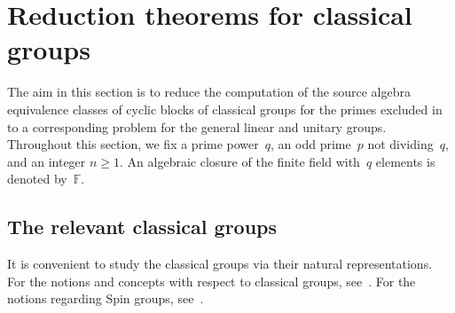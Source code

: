 \documentclass[12pt]{amsart}
\theoremstyle{theorem}
\theoremstyle{definition}
\theoremstyle{remark}
\begin{document}
\section{Reduction theorems for classical groups}

The aim in this section is to reduce the computation of the source algebra 
equivalence classes of cyclic blocks of classical groups for the primes excluded 
in \cite[Proposition~$6.5$(a)]{HL24} to a corresponding problem for the general 
linear and unitary groups. Throughout this section, we fix a prime power~$q$, an 
odd prime~$p$ not dividing~$q$, and an integer $n \geq 1$. An algebraic closure
of the finite field with~$q$ elements is denoted by~$\mathbb{F}$.

\subsection{The relevant classical groups}
\label{TheRelevantClassicalGroups}
It is convenient to study the classical groups via their natural 
representations. For the notions and concepts with respect to classical groups, 
see~\cite{Taylor}. For the notions regarding Spin groups, 
see~\cite{Jac80,Gro02}.
\end{document}
